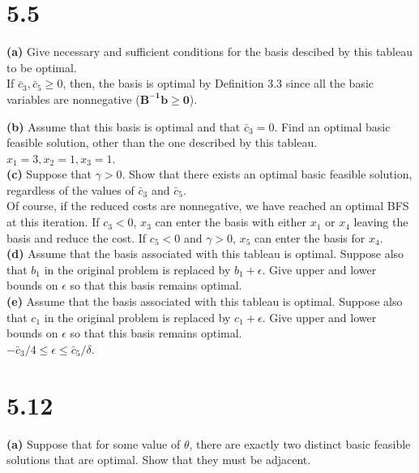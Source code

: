 \documentclass{article}
\begin{document}
\section*{5.5}

\textbf{(a)} Give necessary and sufficient conditions for the basis descibed by this tableau to be optimal. \\

\noindent If $\bar{c}_3, \bar{c}_5 \geq 0$, then, the basis is optimal by Definition 3.3 since all the basic variables are nonnegative ($\mathbf{B^{-1}b \geq 0}$).

\textbf{(b)} Assume that this basis is optimal and that $\bar{c}_3 = 0$.  Find an optimal basic feasible solution, other than the one described by this tableau. \\

\noindent $ x_1 = 3, x_2 = 1, x_3 = 1 $. \\

\textbf{(c)} Suppose that $\gamma > 0$.  Show that there exists an optimal basic feasible solution, regardless of the values of $\bar{c}_3$ and $\bar{c}_5$.   \\

\noindent
Of course, if the reduced costs are nonnegative, we have reached an optimal BFS at this iteration.  If $c_3 < 0$, $x_3$ can enter the basis with either $x_1$ or $x_4$ leaving the basis and reduce the cost.  If $c_5 < 0$ and $\gamma > 0$, $x_5$ can enter the basis for $x_4$.  \\


\textbf{(d)}  Assume that the basis associated with this tableau is optimal.  Suppose also that $b_1$ in the original problem is replaced by $b_1 + \epsilon$.  Give upper and lower bounds on $\epsilon$ so that this basis remains optimal. \\
 
\textbf{(e)}  Assume that the basis associated with this tableau is optimal.  Suppose also that $c_1$ in the original problem is replaced by $c_1 + \epsilon$.  Give upper and lower bounds on $\epsilon$ so that this basis remains optimal. \\

\noindent $ - \bar{c}_3 / 4 \leq \epsilon \leq \bar{c}_5 / \delta$.

\section*{5.12}
\textbf{(a)}  Suppose that for some value of $\theta$, there are exactly two distinct basic feasible solutions that are optimal.  Show that they must be adjacent.  \\
\end{document}
